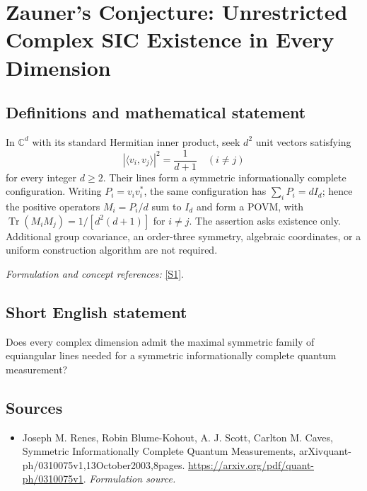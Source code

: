 \documentclass[11pt]{article}
\begin{document}
\section*{\texorpdfstring{Zauner's Conjecture: Unrestricted Complex SIC Existence in Every Dimension}{Zauner's Conjecture: Unrestricted Complex SIC Existence in Every Dimension}}\label{231}
\subsection{Definitions and mathematical statement}
In ${\mathbb{C}}^d$ with its standard Hermitian inner product, seek $d^2$ unit vectors satisfying
\[
 |\langle v_i,v_j\rangle|^2=\frac1{d+1}\quad(i\ne j)
\]
for every integer $d\ge2$. Their lines form a symmetric informationally complete configuration. Writing $P_i=v_iv_i^*$, the same configuration has
$\sum_iP_i=dI_d$; hence the positive operators $M_i=P_i/d$ sum to $I_d$ and form a POVM, with
$\operatorname{Tr}(M_iM_j)=1/[d^2(d+1)]$ for $i\ne j$. The assertion asks existence only. Additional group covariance, an order-three symmetry, algebraic coordinates, or a uniform construction algorithm are not required.
\par\smallskip\textit{Formulation and concept references:} \href{https://arxiv.org/pdf/quant-ph/0310075v1}{[S1]}.

\subsection{Short English statement}
Does every complex dimension admit the maximal symmetric family of equiangular lines needed for a symmetric informationally complete quantum measurement?
\subsection{Sources}
\begin{itemize}
\item[S1]Joseph M. Renes, Robin Blume-Kohout, A. J. Scott, Carlton M. Caves, Symmetric Informationally Complete Quantum Measurements, arXivquant-ph/0310075v1,13October2003,8pages.
\url{https://arxiv.org/pdf/quant-ph/0310075v1}.
\textit{Formulation source.}
\end{itemize}
\end{document}
